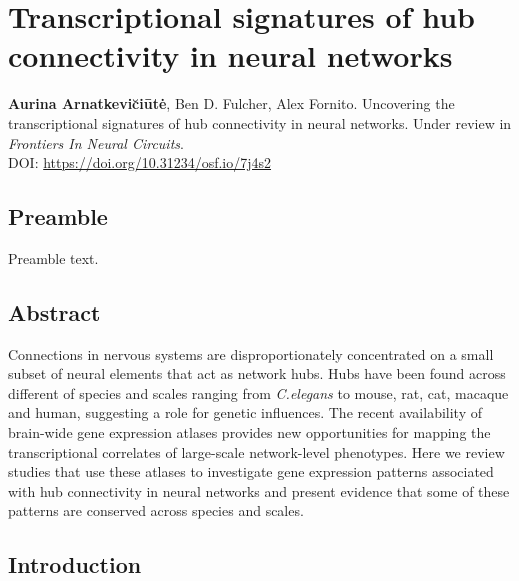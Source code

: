 \chapter{Transcriptional signatures of hub connectivity in neural networks}
\label{ch:Chapter3}



\textbf{Aurina Arnatkevi\u{c}i\={u}t\.{e}},
Ben D. Fulcher,
Alex Fornito.
Uncovering the transcriptional signatures of hub connectivity in neural networks. Under review in \textit{
Frontiers In Neural Circuits}.\\
DOI: \url{https://doi.org/10.31234/osf.io/7j4s2} %


\section*{Preamble}
Preamble text.

\newpage

\section*{Abstract}
Connections in nervous systems are disproportionately concentrated on a small subset of neural elements that act as network hubs. Hubs have been found across different of species and scales ranging from \textit{C.elegans} to mouse, rat, cat, macaque and human, suggesting a role for genetic influences. The recent availability of brain-wide gene expression atlases provides new opportunities for mapping the transcriptional correlates of large-scale network-level phenotypes. Here we review studies that use these atlases to investigate gene expression patterns associated with hub connectivity in neural networks and present evidence that some of these patterns are conserved across species and scales.

\section{Introduction}

